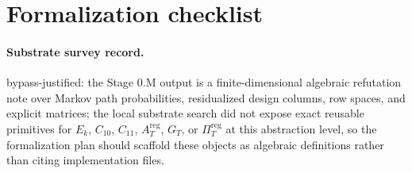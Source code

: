 \documentclass[11pt]{article}
\theoremstyle{definition}
\theoremstyle{plain}
\theoremstyle{remark}
\begin{document}
\section{Formalization checklist}
\paragraph{Substrate survey record.}
bypass-justified: the Stage 0.M output is a finite-dimensional algebraic refutation note over Markov path probabilities, residualized design columns, row spaces, and explicit matrices; the local substrate search did not expose exact reusable primitives for \(E_k\), \(C_{10}\), \(C_{11}\), \(A_T^{\mathrm{reg}}\), \(G_T\), or \(\Pi_T^{\mathrm{reg}}\) at this abstraction level, so the formalization plan should scaffold these objects as algebraic definitions rather than citing implementation files.
\end{document}
